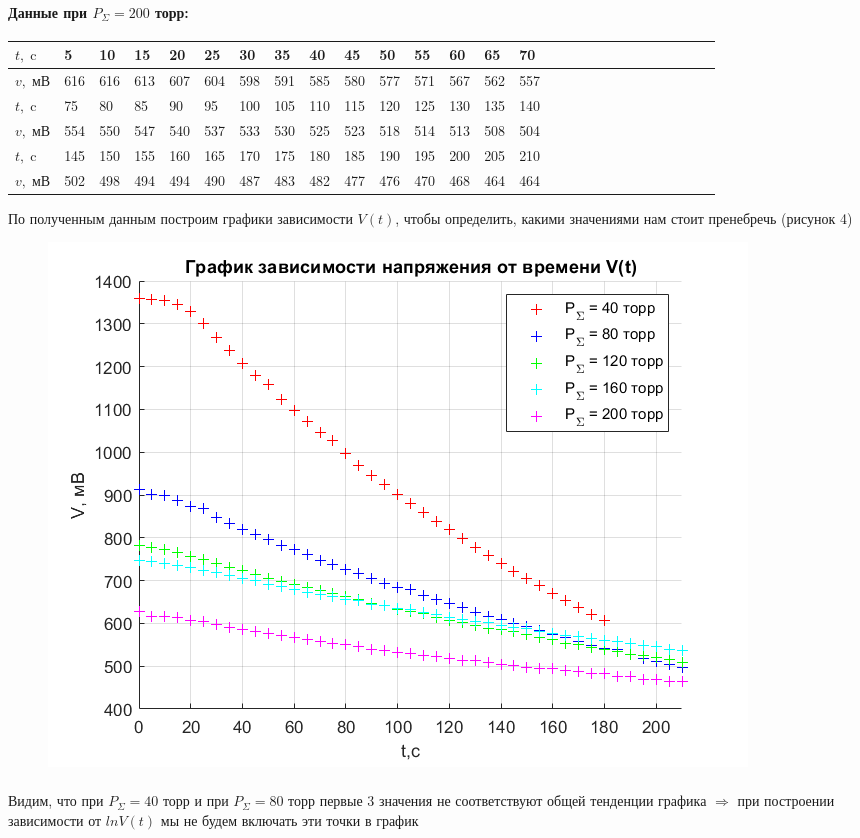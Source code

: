 \documentclass[a4paper,12pt]{article}
\begin{document}
\begin{enumerate}
\paragraph{Данные при $P_{\Sigma} = 200$ торр:}
\begin{center}
\begin{tabular}{|l||l|l|l|l|l|l|l|l|l|l|l|l|l| l|l|l|l|l|l|l|l|l|l|l|l|l|}
\hline
$t,\; \text{c}$ & 5 & 10 & 15 & 20 & 25 & 30 & 35 & 40 & 45 & 50 & 55 & 60 & 65 & 70\\ 
\hline
$v, \; \text{мВ}$ & 616 & 616 & 613 & 607 & 604 & 598 & 591 & 585 & 580 & 577 & 571 & 567 & 562 & 557 \\ 
\hline
\hline
$t,\; \text{c}$ & 75 & 80 & 85 & 90 & 95 & 100 & 105 & 110 & 115 & 120 & 125 & 130 & 135 & 140\\ 
\hline
$v, \; \text{мВ}$ & 554 & 550 & 547 & 540 & 537 & 533 & 530 & 525 & 523 & 518 & 514 & 513 & 508 & 504\\ 
\hline
\hline
$t,\; \text{c}$ & 145 & 150 & 155 & 160 & 165 & 170 & 175 & 180 & 185 & 190 & 195 & 200 & 205 & 210 \\ 
\hline
$v, \; \text{мВ}$ & 502 & 498 & 494 & 494 & 490 & 487 & 483 & 482 & 477 & 476 & 470 & 468 & 464 & 464\\ 
\hline
\end{tabular}
\end{center}
По полученным данным построим графики зависимости $V(t)$, чтобы определить, какими значениями нам стоит пренебречь (рисунок 4)
\begin{figure}[h]
\begin{center}
\includegraphics[width=0.5\linewidth]{graph_1.png}
\label{graph} 
\end{center}
\end{figure}
\paragraph{}
Видим, что при $P_{\Sigma} = 40$ торр и при $P_{\Sigma} = 80$ торр первые 3 значения не соответствуют общей тенденции графика $\Rightarrow$ при построении зависимости от $lnV(t)$ мы не будем включать эти точки в график


\end{enumerate}
\end{document}

